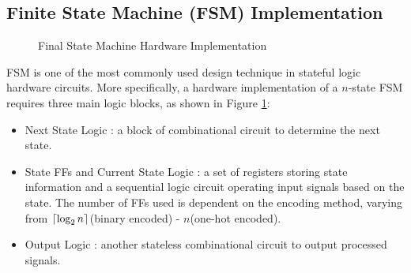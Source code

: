 \documentclass[a4paper]{report}
\DeclarePairedDelimiter\ceil{\lceil}{\rceil}
\begin{document}
\subsection{Finite State Machine (FSM) Implementation}

\begin{figure}[h!]
  \caption{Final State Machine Hardware Implementation}
  \label{fig:fsm-impl}
\end{figure}

FSM is one of the most commonly used design technique in stateful logic hardware circuits. More specifically, a hardware implementation of a $n$-state FSM requires three main logic blocks, as shown in Figure \ref{fig:fsm-impl}:
\begin{itemize}
    \item Next State Logic : a block of combinational circuit to determine the next state.
    \item State FFs and Current State Logic : a set of registers storing state information and a sequential logic circuit operating input signals based on the state. The number of FFs used is dependent on the encoding method, varying from $\ceil*{\log_2 n}$(binary encoded) - $n$(one-hot encoded).
    \item Output Logic : another stateless combinational circuit to output processed signals.
\end{itemize}
\end{document}
